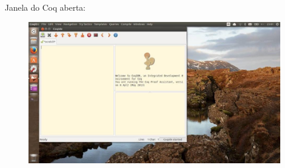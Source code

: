 Janela do Coq aberta:\\
\begin{figure}[!htb]
\includegraphics[scale=0.4]{imagens/linux4.jpg}
\end{figure}